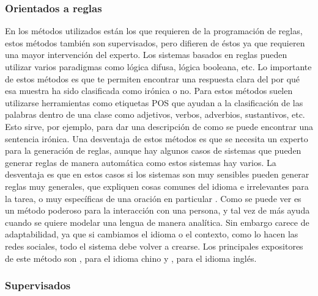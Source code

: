         \subsubsection{Orientados a reglas}
		\par En los métodos utilizados están los que requieren de la programación de reglas, estos métodos también son supervisados, pero difieren de éstos ya que requieren una mayor intervención del experto. Los sistemas basados en reglas pueden utilizar varios paradigmas como lógica difusa, lógica booleana, etc. Lo importante de estos métodos es que te permiten encontrar una respuesta clara del por qué esa muestra ha sido clasificada como irónica o no. Para estos métodos suelen utilizarse herramientas como etiquetas \gls{POS} que ayudan a la clasificación de las palabras dentro de una clase como adjetivos, verbos, adverbios, sustantivos, etc. Esto sirve, por ejemplo, para dar una descripción de como se puede encontrar una sentencia irónica. Una desventaja de estos métodos es que se necesita un experto para la generación de reglas, aunque hay algunos casos de sistemas que pueden generar reglas de manera automática \cite{mitra1995fuzzy} como estos sistemas hay varios. La desventaja es que en estos casos si los sistemas son muy sensibles pueden generar reglas muy generales, que expliquen cosas comunes del idioma e irrelevantes para la tarea, o muy específicas de una oración en particular \cite{kotsiantis2007supervised}. Como se puede ver es un método poderoso para la interacción con una persona, y tal vez de más ayuda cuando se quiere modelar una lengua de manera analítica. Sin embargo carece de adaptabilidad, ya que si cambiamos el idioma o el contexto, como lo hacen las redes sociales, todo el sistema debe volver a crearse. Los principales expositores de este método son \cite{kong2011formalization}, para el idioma chino  y \cite{utsumi1995interpret}, para el idioma inglés. 
		
		\subsubsection{Supervisados}
		
